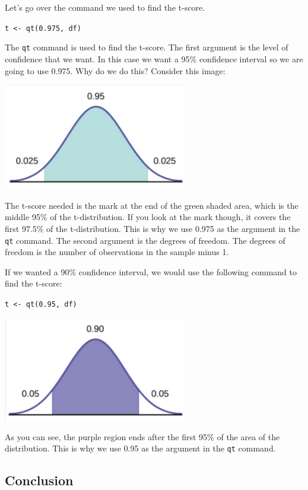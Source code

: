 \documentclass[
  letterpaper,
  DIV=11,
  numbers=noendperiod]{scrreprt}
\begin{document}
Let's go over the command we used to find the t-score.

\texttt{t\ \textless{}-\ qt(0.975,\ df)}

The \texttt{qt} command is used to find the t-score. The first argument
is the level of confidence that we want. In this case we want a 95\%
confidence interval so we are going to use 0.975. Why do we do this?
Consider this image:

\includegraphics[width=0.6\textwidth,height=\textheight]{./images/EPCI_9.jpg}

The t-score needed is the mark at the end of the green shaded area,
which is the middle 95\% of the t-distribution. If you look at the mark
though, it covers the first 97.5\% of the t-distribution. This is why we
use 0.975 as the argument in the \texttt{qt} command. The second
argument is the degrees of freedom. The degrees of freedom is the number
of observations in the sample minus 1.

If we wanted a 90\% confidence interval, we would use the following
command to find the t-score:

\texttt{t\ \textless{}-\ qt(0.95,\ df)}

\includegraphics[width=0.6\textwidth,height=\textheight]{./images/EPCI_10.jpg}

As you can see, the purple region ends after the first 95\% of the area
of the distribution. This is why we use 0.95 as the argument in the
\texttt{qt} command.

\subsection*{Conclusion}\label{conclusion-4}
\end{document}
